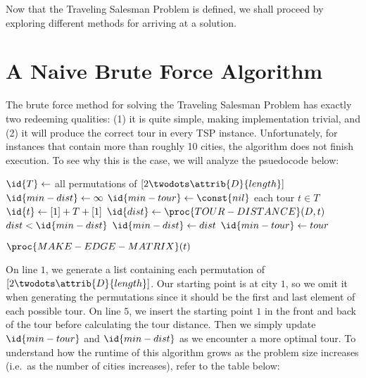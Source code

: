 \documentclass{article}
\begin{document}
Now that the Traveling Salesman Problem is defined, we shall proceed by
exploring different methods for arriving at a solution.

\section*{A Naive Brute Force Algorithm}
The brute force method for solving the Traveling Salesman Problem has exactly
two redeeming qualities: (1) it is quite simple, making implementation
trivial, and (2) it will produce the correct tour in every TSP instance.
Unfortunately, for instances that contain more than roughly 10 cities, the
algorithm does not finish execution.  To see why this is the case, we will
analyze the psuedocode below:
\par
\vspace{0.5cm}


\begin{codebox}
\li $\id{T} \gets$ all permutations of $[2 \twodots \attrib{D}{length}]$
\li $\id{min-dist} \gets \infty$
\li $\id{min-tour} \gets \const{nil}$
\li \For each tour $t \in T$
\li   \Do
        $\id{t} \gets [1] + T + [1]$
\li       $\id{dist} \gets \proc{TOUR-DISTANCE}(D, t)$
\li	  \If $dist < \id{min-dist}$
\li	    \Then
              $\id{min-dist} \gets dist$
\li	      $\id{min-tour} \gets tour$
            \End
       \End

\li   \Return $\proc{MAKE-EDGE-MATRIX}(t)$
\end{codebox}
\vspace{0.5cm}

On line $1$, we generate a list containing each permutation of
$[2 \twodots \attrib{D}{length}]$.  Our starting point is at city
$1$, so we omit it when generating the permutations since it should
be the first and last element of each possible tour.  On line $5$,
we insert the starting point $1$ in the front and back of the tour
before calculating the tour distance.  Then we simply update $\id{min-tour}$
and $\id{min-dist}$ as we encounter a more optimal tour.  To understand
how the runtime of this algorithm grows as the problem size increases
(i.e.\ as the number of cities increases), refer to the table below:
\par
\vspace{0.25cm}
\end{document}
